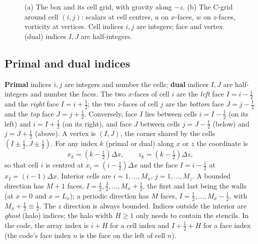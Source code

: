 \documentclass[11pt,a4paper]{article}
\begin{document}
\begin{figure}[ht]
\caption{(a) The box and its cell grid, with gravity along $-z$. (b) The C-grid around cell $(i,j)$: scalars at cell centres, $u$ on $x$-faces, $w$ on $z$-faces, vorticity at vertices. Cell indices $i,j$ are integers; face and vertex (dual) indices $I,J$ are half-integers.}
\label{fig:grid}
\end{figure}

\subsection{Primal and dual indices}\label{sec:indices}
\textbf{Primal} indices $i,j$ are integers and number the cells; \textbf{dual} indices $I,J$ are half-integers and number the faces. The two $x$-faces of cell $i$ are the \emph{left} face $I=i-\tfrac12$ and the \emph{right} face $I=i+\tfrac12$; the two $z$-faces of cell $j$ are the \emph{bottom} face $J=j-\tfrac12$ and the \emph{top} face $J=j+\tfrac12$.
Conversely, face $I$ lies between cells $i=I-\tfrac12$ (on its left) and $i=I+\tfrac12$ (on its right), and face $J$ between cells $j=J-\tfrac12$ (below) and $j=J+\tfrac12$ (above). A vertex is $(I,J)$, the corner shared by the cells $(I\pm\tfrac12,J\pm\tfrac12)$. For any index $k$ (primal or dual) along $x$ or $z$ the coordinate is
\begin{equation}
  x_k=(k-\tfrac12)\Delta x,\qquad z_k=(k-\tfrac12)\Delta z ,
\end{equation}
so that cell $i$ is centred at $x_i=(i-\tfrac12)\Delta x$ and the face $I=i-\tfrac12$ at $x_I=(i-1)\Delta x$.
Interior cells are $i=1,\dots,M_x$, $j=1,\dots,M_z$. A bounded direction has $M+1$ faces, $I=\tfrac12,\tfrac32,\dots,M_x+\tfrac12$, the first and last being the walls (at $x=0$ and $x=L_x$); a periodic direction has $M$ faces,
$I=\tfrac12,\dots,M_x-\tfrac12$, with $M_x+\tfrac12\equiv\tfrac12$. The $z$ direction is always bounded.
Indices outside the interior are \emph{ghost} (halo) indices; the halo width $H\ge1$ only needs to contain the stencils.
In the code, the array index is $i+H$ for a cell index and $I+\tfrac12+H$ for a face index (the code's face index $n$ is the face on the left of cell $n$).
\end{document}
